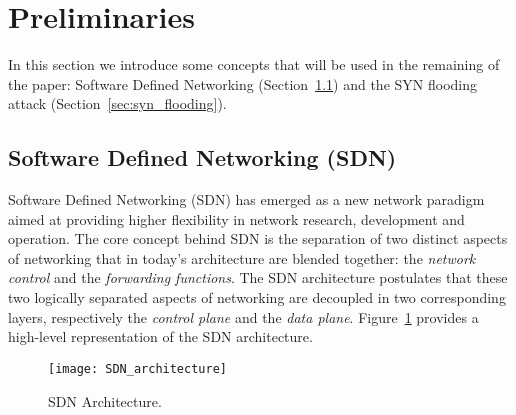 \documentclass{sig-alternate}
\begin{document}
\section{Preliminaries}\label{sec:background}

In this section we introduce some concepts that will be used in the remaining of the paper: Software Defined Networking (Section~\ref{sec:sdn_preliminaries}) and the SYN flooding attack (Section~\ref{sec:syn_flooding}).

\subsection{Software Defined Networking (SDN)}\label{sec:sdn_preliminaries}
Software Defined Networking (SDN) has emerged as a new network paradigm aimed at providing higher flexibility in network research, development and operation. The core concept behind SDN is the separation of two distinct aspects of networking that in today's architecture are blended together: the {\em network control} and the {\em forwarding functions}.
The SDN architecture postulates that these two logically separated aspects of networking are decoupled in two corresponding layers, respectively the {\em control plane} and the {\em data plane}.
Figure~\ref{fig:SDN} provides a high-level representation of the SDN architecture.

	\begin{figure}[ht]
	    \centering
	    \texttt{[image: SDN\_architecture]}
	    \caption{SDN Architecture.}
	    \label{fig:SDN}
	\end{figure}
\end{document}
